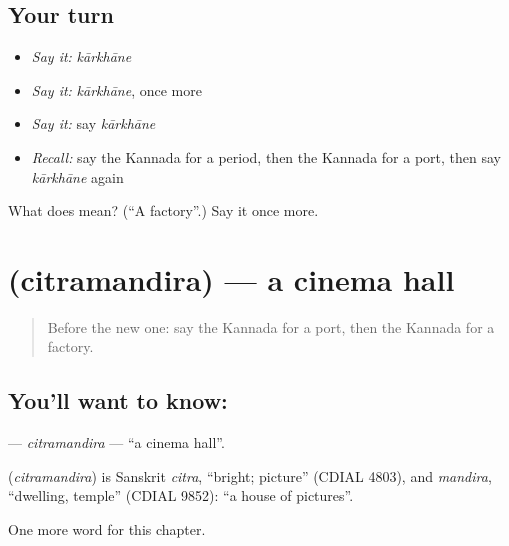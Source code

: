 \subsection*{Your turn}
\begin{itemize}
\raggedright
  \item \emph{Say it:} \emph{kārkhāne}
  \item \emph{Say it:} \emph{kārkhāne}, once more
  \item \emph{Say it:} say \emph{kārkhāne}
  \item \emph{Recall:} say the Kannada for a period, then the Kannada for a port, then say \emph{kārkhāne} again
\end{itemize}

\begin{tcolorbox}[breakable,colback=teal!4,colframe=teal!35!black,title={Before you move on}]
What does  mean? (\textquotedblleft{}A factory\textquotedblright{}.) Say it once more.
\end{tcolorbox}
\section[\texorpdfstring{\kn{ಚಿತ್ರಮಂದಿರ} (citramandira)}{ಚಿತ್ರಮಂದಿರ (citramandira)}]{ (citramandira) — a cinema hall}

\label{lesson:KA-C212-citramandira}



\begin{quote}
Before the new one: say the Kannada for a port, then the Kannada for a factory.
\end{quote}

\subsection*{You'll want to know: }
\textbf{} — \emph{citramandira} — \textquotedblleft{}a cinema hall\textquotedblright{}.

\begin{cousinweb}
\textbf{} (\emph{citramandira}) is Sanskrit \emph{citra}, \textquotedblleft{}bright; picture\textquotedblright{} (CDIAL 4803), and \emph{mandira}, \textquotedblleft{}dwelling, temple\textquotedblright{} (CDIAL 9852): \textquotedblleft{}a house of pictures\textquotedblright{}.
\end{cousinweb}

\begin{grammarlens}[title={What you've built}]
One more word for this chapter.
\end{grammarlens}

